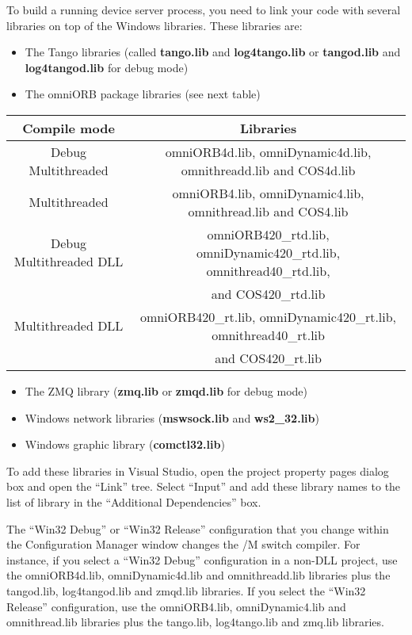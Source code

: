 To build a running device server process, you need to link your code
with several libraries on top of the Windows libraries. These libraries
are:
\begin{itemize}
\item The Tango libraries (called \textbf{tango.lib} and \textbf{log4tango.lib}
or \textbf{tangod.lib} and \textbf{log4tangod.lib} for debug mode)
\item The omniORB package libraries (see next table)\\

\end{itemize}
\begin{center}
\begin{longtable}{|c|c|}
\hline 
Compile mode & Libraries\tabularnewline
\hline 
\hline 
Debug Multithreaded & omniORB4d.lib, omniDynamic4d.lib, omnithreadd.lib and COS4d.lib\tabularnewline
\hline 
Multithreaded & omniORB4.lib, omniDynamic4.lib, omnithread.lib and COS4.lib\tabularnewline
\hline 
Debug Multithreaded DLL & omniORB420\_rtd.lib, omniDynamic420\_rtd.lib, omnithread40\_rtd.lib,\tabularnewline
 & and COS420\_rtd.lib\tabularnewline
\hline 
Multithreaded DLL & omniORB420\_rt.lib, omniDynamic420\_rt.lib, omnithread40\_rt.lib\tabularnewline
 & and COS420\_rt.lib\tabularnewline
\hline 
\end{longtable}
\par\end{center}
\begin{itemize}
\item The ZMQ library (\textbf{zmq.lib} or \textbf{zmqd.lib} for debug mode)
\item Windows network libraries (\textbf{mswsock.lib} and \textbf{ws2\_32.lib})
\item Windows graphic library (\textbf{comctl32.lib})
\end{itemize}
To add these libraries in Visual Studio, open the project property
pages dialog box and open the ``Link'' tree. Select ``Input''
and add these library names to the list of library in the ``Additional
Dependencies'' box. 

The ``Win32 Debug'' or ``Win32 Release'' configuration that you
change within the \textquotedbl{}Configuration Manager\textquotedbl{}
window changes the /M switch compiler. For instance, if you select
a ``Win32 Debug'' configuration in a \textquotedbl{}non-DLL\textquotedbl{}
project, use the omniORB4d.lib, omniDynamic4d.lib and omnithreadd.lib
libraries plus the tangod.lib, log4tangod.lib and zmqd.lib libraries.
If you select the ``Win32 Release'' configuration, use the omniORB4.lib,
omniDynamic4.lib and omnithread.lib libraries plus the tango.lib,
log4tango.lib and zmq.lib libraries.

